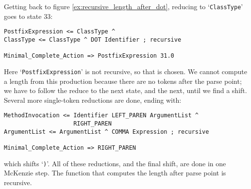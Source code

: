 \documentclass{article}
\newcommand{\code}[1]{`\lstinline|#1|'}
\begin{document}
Getting back to figure \ref{ex:recursive_length_after_dot}, reducing
to \code{ClassType} goes to state 33:
\begin{verbatim}
PostfixExpression <= ClassType ^
ClassType <= ClassType ^ DOT Identifier ; recursive

Minimal_Complete_Action => PostfixExpression 31.0
\end{verbatim}
Here \code{PostfixExpression} is not recursive, so that is chosen. We
cannot compute a length from this production because there are no
tokens after the parse point; we have to follow the reduce to the next
state, and the next, until we find a shift. Several more single-token
reductions are done, ending with:
\begin{verbatim}
MethodInvocation <= Identifier LEFT_PAREN ArgumentList ^
                    RIGHT_PAREN
ArgumentList <= ArgumentList ^ COMMA Expression ; recursive

Minimal_Complete_Action => RIGHT_PAREN
\end{verbatim}
which shifts \code{)}. All of these reductions, and the final shift,
are done in one McKenzie step. The function that computes the length
after parse point is recursive.
\end{document}
